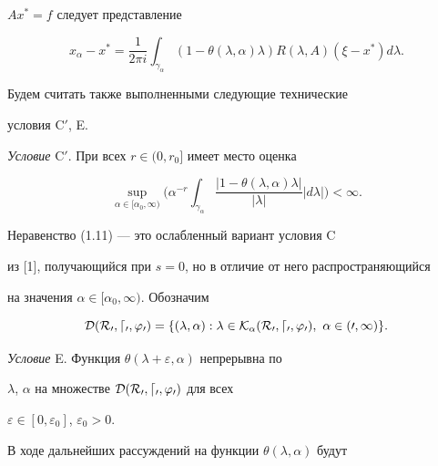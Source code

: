 $A x^*=f$ следует представление


\begin{equation}


x_\alpha-x^*=\frac{1}{2\pi 


i}\int_{\gamma_\alpha}(1-\theta(\lambda,\alpha)\lambda)R(\lambda,A)


(\xi-x^*)d\lambda.


\end{equation}


Будем считать также выполненными следующие технические 


условия C$'$, E.


\medskip





{\it Условие} C$'$. При всех $r\in(0,r_0]$ имеет место оценка


\begin{equation}


\sup_{\alpha\in[\alpha_0,\infty)}\bigg(\alpha^{-r}


\int_{\gamma_\alpha}\frac{|1-\theta(\lambda,\alpha)\lambda|}


{|\lambda|}|d\lambda|\bigg)<\infty.


\end{equation}





Неравенство (1.11) --- это ослабленный вариант условия C 


из [1], получающийся при $s=0$, но в отличие от него распространяющийся 


на значения $\alpha\in[\alpha_0,\infty)$. Обозначим


$$


\cal D(R_0,d_0,\varphi_0)=\{(\lambda,\alpha):\lambda\in


K_\alpha(R_0,d_0,\varphi_0),\ \alpha\in(0,\infty)\}.


$$





{\it Условие} E. Функция $\theta(\lambda+\varepsilon,\alpha)$ непрерывна по 


$\lambda$, $\alpha$ на множестве $\cal D(R_0,d_0,\varphi_0)$ для всех


$\varepsilon\in[0,\varepsilon_0]$, $\varepsilon_0>0$.





В ходе дальнейших рассуждений на функции $\theta(\lambda,\alpha)$ будут 


